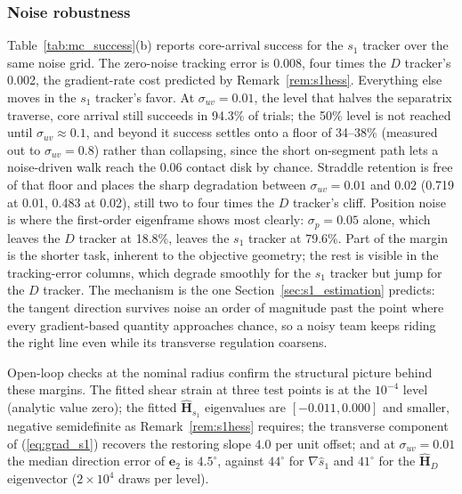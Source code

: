 \documentclass[lettersize,journal]{IEEEtran}
\begin{document}
\subsubsection{Noise robustness}
Table~\ref{tab:mc_success}(b) reports core-arrival success for the
$s_1$ tracker over the same noise grid. The zero-noise tracking error
is 0.008, four times the $D$
tracker's 0.002, the gradient-rate cost predicted by
Remark~\ref{rem:s1hess}. Everything else moves in the $s_1$ tracker's
favor. At $\sigma_{uv} = 0.01$, the level that halves the separatrix
traverse, core arrival still succeeds in 94.3\% of trials; the 50\%
level is not reached until $\sigma_{uv} \approx 0.1$, and beyond it
success settles onto a floor of 34--38\% (measured out to $\sigma_{uv}
= 0.8$) rather than collapsing, since the short on-segment path lets a
noise-driven walk reach the 0.06 contact disk by chance. Straddle
retention is free of that floor and places the sharp degradation
between $\sigma_{uv} = 0.01$ and $0.02$ (0.719 at 0.01, 0.483 at
0.02), still two to four times the $D$ tracker's cliff. Position noise is
where the first-order eigenframe shows most clearly: $\sigma_p = 0.05$
alone, which leaves the $D$ tracker at 18.8\%, leaves the $s_1$
tracker at 79.6\%. Part of the margin is the shorter task, inherent to
the objective geometry; the rest is visible in the tracking-error
columns, which degrade smoothly for the $s_1$ tracker but jump for the
$D$ tracker. The
mechanism is the one Section~\ref{sec:s1_estimation} predicts: the
tangent direction survives noise an order of magnitude past the point
where every gradient-based quantity approaches chance, so a noisy team
keeps riding the right line even while its transverse regulation
coarsens.

Open-loop checks at the nominal radius confirm the structural picture
behind these margins. The fitted shear strain at three test points is
at the $10^{-4}$ level (analytic value zero); the fitted
$\hat{\mathbf{H}}_{s_1}$ eigenvalues are $[-0.011, 0.000]$ and smaller,
negative semidefinite as Remark~\ref{rem:s1hess} requires; the
transverse component of (\ref{eq:grad_s1}) recovers the restoring slope
$4.0$ per unit offset; and at $\sigma_{uv} = 0.01$ the median direction
error of $\mathbf{e}_2$ is $4.5^\circ$, against $44^\circ$ for
$\nabla\hat{s}_1$ and $41^\circ$ for the $\hat{\mathbf{H}}_D$
eigenvector ($2\times 10^4$ draws per level).
\end{document}
